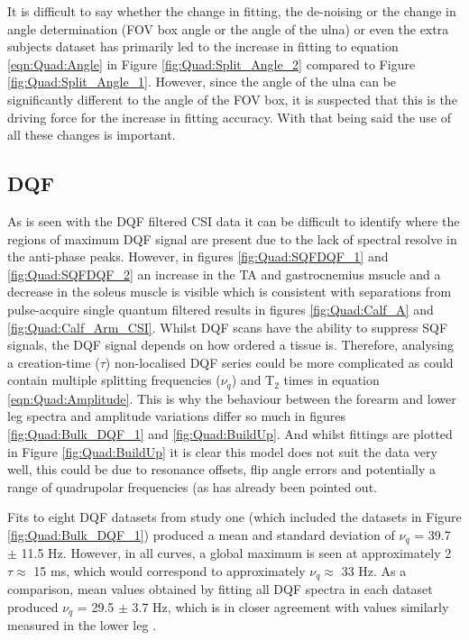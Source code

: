 \documentclass[class=article, crop=false]{standalone}
\begin{document}
It is difficult to say whether the change in fitting, the de-noising  or the change in angle determination (FOV box angle or the angle of the ulna) or even the extra subjects dataset has primarily led to the increase in fitting to equation \ref{eqn:Quad:Angle} in Figure \ref{fig:Quad:Split_Angle_2} compared to Figure \ref{fig:Quad:Split_Angle_1}. However, since the angle of the ulna can be significantly different to the angle of the FOV box, it is suspected that this is the driving force for the increase in fitting accuracy. With that being said the use of all these changes is important.

\subsection{DQF}

As is seen with the DQF filtered CSI data it can be difficult to identify where the regions of maximum DQF signal are present due to the lack of spectral resolve in the anti-phase peaks. However, in figures \ref{fig:Quad:SQFDQF_1} and \ref{fig:Quad:SQFDQF_2} an increase in the TA and gastrocnemius msucle and a decrease in the soleus muscle is visible which is consistent with separations from pulse-acquire single quantum filtered results in figures \ref{fig:Quad:Calf_A} and \ref{fig:Quad:Calf_Arm_CSI}. Whilst DQF scans have the ability to suppress SQF signals, the DQF signal depends on how ordered a tissue is. Therefore, analysing a creation-time ($\tau$) non-localised DQF series could be more complicated as could contain multiple splitting frequencies ($\nu_q$) and T$_2$ times in equation \ref{eqn:Quad:Amplitude}. This is why the behaviour between the forearm and lower leg spectra and amplitude variations differ so much in figures \ref{fig:Quad:Bulk_DQF_1} and \ref{fig:Quad:BuildUp}. And whilst fittings are plotted in Figure \ref{fig:Quad:BuildUp} it is clear this model does not suit the data very well, this could be due to resonance offsets, flip angle errors and potentially a range of quadrupolar frequencies \cite{Sharf1995DetectionNMR-Spectroscopy} (as has already been pointed out. 

Fits to eight DQF datasets from study one (which included the datasets in Figure \ref{fig:Quad:Bulk_DQF_1}) produced a mean and standard deviation of $\nu_q$ = 39.7 $\pm$ 11.5 Hz. However, in all curves, a global maximum is seen at approximately 2$\tau \approx$ 15 ms, which would correspond to approximately $\nu_q \approx$ 33 Hz. As a comparison, mean values obtained by fitting all DQF spectra in each dataset produced $\nu_q$ = 29.5 $\pm$ 3.7 Hz, which is in closer agreement with values similarly measured in the lower leg \cite{Gursan2022ResidualMuscle}. 
\end{document}
